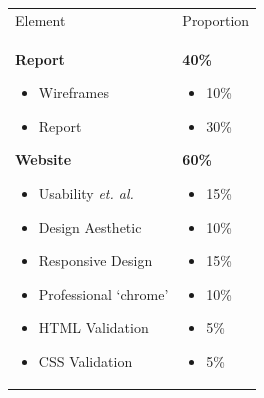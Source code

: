 \begin{table}[h!]
     \begin{center}
     \begin{tabular}{p{5cm}  p{5cm} }
     \toprule
      \textbf\large{Element} & \textbf\large{Proportion} \\ 
    \cmidrule(r){1-1}\cmidrule(lr){2-2}
      \textbf{Report}
		      \begin{itemize}[topsep=0pt]
		      		\item[] Wireframes
		      		\item[] Report 
		      \end{itemize}
      \textbf{Website}
            	\begin{itemize}[topsep=0pt]
			      \item[] Usability \emph{et. al.}
			      \item[] Design Aesthetic
			      \item[] Responsive Design
			      \item[] Professional `chrome'
			      \item[] HTML Validation
			      \item[] CSS Validation 
      			\end{itemize}
      & 
      \textbf{40\%}
		      \begin{itemize}[topsep=0pt]
		      \item[] 10\%
		      \item[] 30\%
		      \end{itemize}
      \textbf{60\%}
            \begin{itemize}[topsep=0pt]
			      \item[] 15\%
			      \item[] 10\%
			      \item[] 15\%
			      \item[] 10\%
				  \item[] 5\%
				  \item[] 5\%		      
      		\end{itemize}
      \\ \bottomrule
      \end{tabular}
      \label{tbl:markSchemeAsmt2}
      \end{center}
 \end{table}
  

